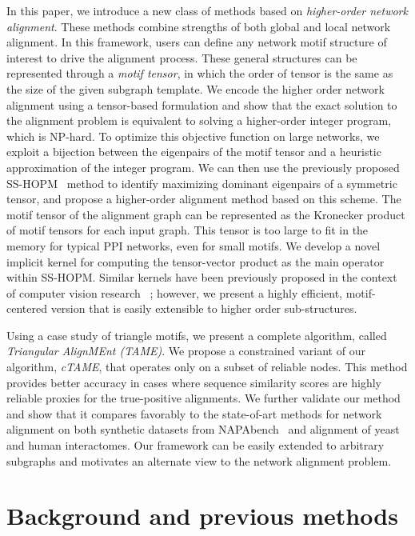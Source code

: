 \documentclass[10pt, journal, compsoc, final]{IEEEtran}
\begin{document}
In this paper, we introduce a new class of methods based on \textit{higher-order network
alignment}. These methods combine strengths of both global and local network alignment.
In this framework, users can define any network motif structure of interest to drive the
alignment process. These general structures can be represented through a \textit{motif tensor},
in which the order of tensor is the same as the size of the given subgraph template.
We encode the higher order network alignment using a tensor-based formulation and show that
the exact solution to the alignment problem is equivalent to solving a higher-order
integer program, which is NP-hard. To optimize this objective function on large networks,
we exploit a bijection between
the eigenpairs of the motif tensor and a heuristic approximation of the 
integer program. We can then use the previously proposed SS-HOPM~\cite{SSHOPM} method
to identify maximizing dominant eigenpairs of a symmetric tensor,
and propose a higher-order alignment method based on this scheme. The motif tensor of the
alignment graph can be represented as the Kronecker product of motif tensors for each input graph.
This tensor is too large to fit in the memory for typical PPI networks, even for small motifs.
We develop a novel implicit kernel for computing the tensor-vector product as the main
operator within SS-HOPM.  Similar kernels have been previously proposed in the context of computer vision research
~\cite{svab2007-exploiting,Chertok-2010-higher-order}; however, we present a highly efficient, motif-centered version that is easily extensible to higher order sub-structures.

Using a case study of triangle motifs, we present a complete algorithm, called
\textit{Triangular AlignMEnt (TAME)}. 
We propose a constrained variant of our algorithm, \textit{cTAME}, that
operates only on a subset of reliable nodes. This method provides better accuracy in cases where 
sequence similarity scores are highly reliable proxies for the true-positive alignments. We further validate our method and show that it compares favorably to the state-of-art methods for network alignment on both synthetic datasets from NAPAbench~\cite{NAPAbench} and alignment of yeast and human interactomes. Our framework can be easily extended to
arbitrary subgraphs and motivates an alternate view to the network alignment problem.

\section{Background and previous methods}
\label{sec:background}
\end{document}
